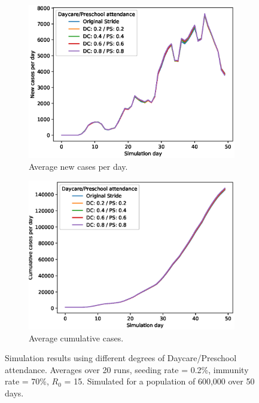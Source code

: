 \documentclass[runningheads]{llncs}
\begin{document}
\begin{figure}
	\centering
	\begin{subfigure}[b]{0.6\linewidth}
		\includegraphics[width=\linewidth]{Daycare-Preschool/cases_per_day_20runs.eps}
		\caption{Average new cases per day.}
	\end{subfigure}
	\begin{subfigure}[b]{0.6\linewidth}
		\includegraphics[width=\linewidth]{Daycare-Preschool/cumulative_cases_20runs.eps}
		\caption{Average cumulative cases.}
	\end{subfigure}
	\caption{Simulation results using different degrees of Daycare/Preschool attendance. Averages over 20 runs, seeding rate = 0.2\%, immunity rate = 70\%, $R_0$ = 15. Simulated for a population of 600,000 over 50 days.}
	\label{daycare-preschool}
\end{figure}
\end{document}
